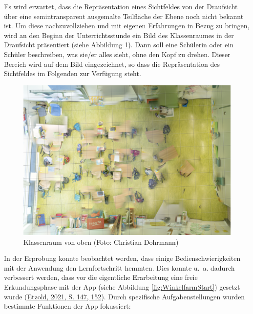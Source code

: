 \documentclass[
  ngerman,
]{scrbook}
\theoremstyle{definition}
\theoremstyle{definition}
\theoremstyle{definition}
\theoremstyle{definition}
\theoremstyle{remark}
\begin{document}
Es wird erwartet, dass die Repräsentation eines Sichtfeldes von der Draufsicht über eine semintransparent ausgemalte Teilfläche der Ebene noch nicht bekannt ist. Um diese nachzuvollziehen und mit eigenen Erfahrungen in Bezug zu bringen, wird an den Beginn der Unterrichtsstunde ein Bild des Klassenraumes in der Draufsicht präsentiert (siehe Abbildung \ref{fig:Klassenraum}). Dann soll eine Schülerin oder ein Schüler beschreiben, was sie/er alles sieht, ohne den Kopf zu drehen. Dieser Bereich wird auf dem Bild eingezeichnet, so dass die Repräsentation des Sichtfeldes im Folgenden zur Verfügung steht.

\begin{figure}

{\centering \includegraphics[width=0.75\linewidth]{pictures/2-Klassenraum} 

}

\caption{Klassenraum von oben (Foto: Christian Dohrmann)}\label{fig:Klassenraum}
\end{figure}

In der Erprobung konnte beobachtet werden, dass einige Bedienschwierigkeiten mit der Anwendung den Lernfortschritt hemmten. Dies konnte u.~a. dadurch verbessert werden, dass vor die eigentliche Erarbeitung eine freie Erkundungsphase mit der App (siehe Abbildung \ref{fig:WinkelfarmStart}) gesetzt wurde (\protect\hyperlink{ref-Etzold2021}{Etzold, 2021, S. 147, 152}). Durch spezifische Aufgabenstellungen wurden bestimmte Funktionen der App fokussiert:
\end{document}
